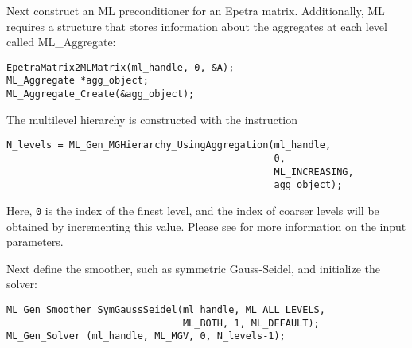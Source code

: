 Next construct an ML preconditioner for an Epetra matrix.
Additionally, ML requires a structure that stores 
information about the aggregates at each level called ML\_Aggregate:
\begin{verbatim}
EpetraMatrix2MLMatrix(ml_handle, 0, &A);
ML_Aggregate *agg_object;
ML_Aggregate_Create(&agg_object);
\end{verbatim}

The multilevel hierarchy is constructed with the instruction
\begin{verbatim}
N_levels = ML_Gen_MGHierarchy_UsingAggregation(ml_handle,
                                               0,
                                               ML_INCREASING,
                                               agg_object);
\end{verbatim}
Here, \verb!0! is the index of the finest level, and the index of
coarser levels will be obtained by incrementing this value.
Please see \cite{ML-Users-Guide} for more information on the input parameters.

Next define the smoother, such as symmetric Gauss-Seidel,
and initialize the solver:
\begin{verbatim}
ML_Gen_Smoother_SymGaussSeidel(ml_handle, ML_ALL_LEVELS,
                               ML_BOTH, 1, ML_DEFAULT);
ML_Gen_Solver (ml_handle, ML_MGV, 0, N_levels-1);
\end{verbatim}


